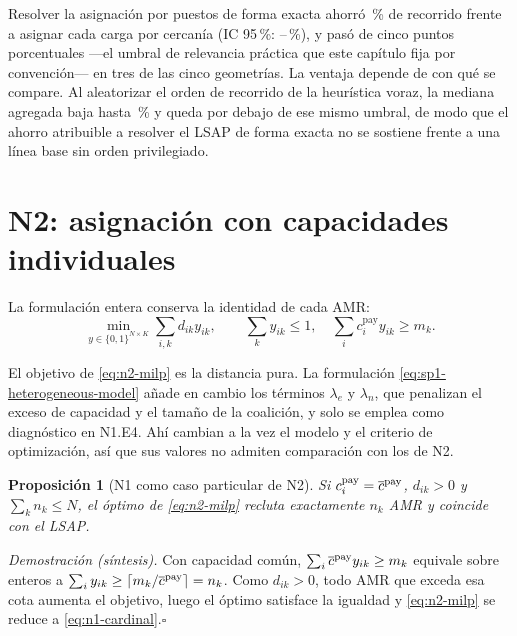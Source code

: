 \documentclass[12pt,a4paper]{article}
\newtheorem{n1prop}{Proposición}
\theoremstyle{remark}
\theoremstyle{plain}
\newcommand{\proofsketch}[1]{%
  {\small\textit{Demostración (síntesis).} #1\hfill$\square$\par}
}
\begin{document}
Resolver la asignación por puestos de forma exacta ahorró \NOneSavingPct\,\% de
recorrido frente a asignar cada carga por cercanía (IC 95\,\%:
\NOneSavingLowPct--\NOneSavingHighPct\,\%), y pasó de cinco puntos porcentuales
---el umbral de relevancia práctica que este capítulo fija por convención--- en
tres de las cinco geometrías. La ventaja depende de con qué se compare. Al
aleatorizar el orden de recorrido de la heurística voraz, la mediana agregada baja
hasta \NOneOrderOverallPct\,\% y queda por debajo de ese mismo umbral, de modo que
el ahorro atribuible a resolver el LSAP de forma exacta no se sostiene frente a
una línea base sin orden privilegiado.


\section{N2: asignación con capacidades individuales}

La formulación entera conserva la identidad de cada AMR:
\begin{equation}
\label{eq:n2-milp}
\min_{y\in\{0,1\}^{N\times K}}\sum_{i,k}d_{ik}y_{ik},
\qquad \sum_ky_{ik}\le1,\quad
\sum_ic_i^{\mathrm{pay}}y_{ik}\ge m_k .
\tag{6}
\end{equation}

El objetivo de \eqref{eq:n2-milp} es la distancia pura. La formulación
\eqref{eq:sp1-heterogeneous-model} añade en cambio los términos $\lambda_e$ y
$\lambda_n$, que penalizan el exceso de capacidad y el tamaño de la coalición, y
solo se emplea como diagnóstico en N1.E4. Ahí cambian a la vez el modelo y el
criterio de optimización, así que sus valores no admiten comparación con los
de N2.

\begin{n1prop}[N1 como caso particular de N2]
Si $c_i^{\rm pay}=\overline{c}^{\rm pay}$, $d_{ik}>0$ y $\sum_kn_k\le N$, el óptimo
de \eqref{eq:n2-milp} recluta exactamente $n_k$ AMR y coincide con el LSAP.
\end{n1prop}
\proofsketch{Con capacidad común, $\sum_i\overline{c}^{\rm pay}y_{ik}\ge m_k$ equivale
sobre enteros a $\sum_iy_{ik}\ge\lceil m_k/\overline{c}^{\rm pay}\rceil=n_k$. Como
$d_{ik}>0$, todo AMR que exceda esa cota aumenta el objetivo, luego el óptimo
satisface la igualdad y \eqref{eq:n2-milp} se reduce a \eqref{eq:n1-cardinal}.}
\end{document}
